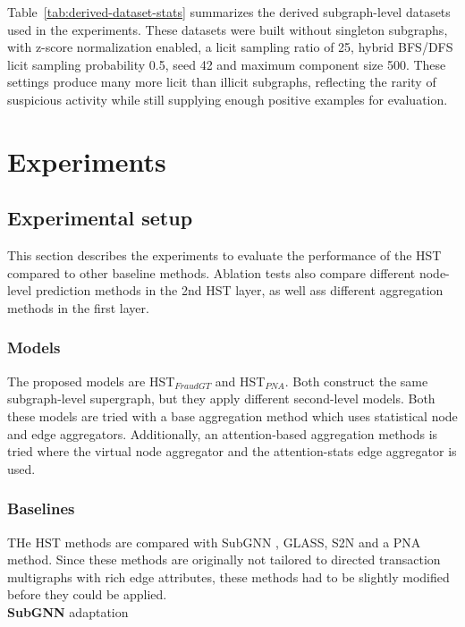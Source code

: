 \documentclass[12pt, twocolumn]{report}
\begin{document}
Table~\ref{tab:derived-dataset-stats} summarizes the derived subgraph-level datasets used in the experiments. These datasets were built without singleton subgraphs, with z-score normalization enabled, a licit sampling ratio of 25, hybrid BFS/DFS licit sampling probability 0.5, seed 42 and maximum component size 500. These settings produce many more licit than illicit subgraphs, reflecting the rarity of suspicious activity while still supplying enough positive examples for evaluation.


\chapter{Experiments}
\label{chap:experiments}

\section{Experimental setup}

This section describes the experiments to evaluate the performance of the HST compared to other baseline methods. Ablation tests also compare different node-level prediction methods in the 2nd HST layer, as well ass different aggregation methods in the first layer.

\subsection{Models}
The proposed models are HST$_{FraudGT}$ and HST$_{PNA}$. Both construct the same subgraph-level supergraph, but they apply different second-level models. Both these models are tried with a base aggregation method which uses statistical node and edge aggregators. Additionally, an attention-based aggregation methods is tried where the virtual node aggregator and the attention-stats edge aggregator is used.

\subsection{Baselines}
THe HST methods are compared with SubGNN \cite{subgnn2020}, GLASS, S2N and a PNA method. Since these methods are originally not tailored to directed transaction multigraphs with rich edge attributes, these methods had to be slightly modified before they could be applied. \\

\noindent
\textbf{SubGNN} adaptation \\
\end{document}
